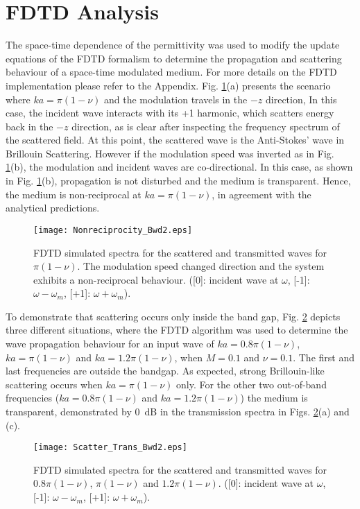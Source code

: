\documentclass[journal]{IEEEtran}
\begin{document}
\section{FDTD Analysis}
The space-time dependence of the permittivity was used to modify the update equations of the FDTD formalism to determine the propagation and scattering behaviour of a space-time modulated medium. For more details on the FDTD implementation please refer to the Appendix. Fig. \ref{fig:Nonrecip_bwd}(a) presents the scenario where $ka=\pi(1-\nu)$ and the modulation travels in the $-z$ direction, In this case, the incident wave interacts with its +1 harmonic, which scatters energy back in the $-z$ direction, as is clear after inspecting the frequency spectrum of the scattered field. At this point, the scattered wave is the Anti-Stokes' wave in Brillouin Scattering. However if the modulation speed was inverted as in Fig. \ref{fig:Nonrecip_bwd}(b), the modulation and incident waves are co-directional. In this case, as shown in Fig. \ref{fig:Nonrecip_bwd}(b), propagation is not disturbed and the medium is transparent. Hence, the medium is non-reciprocal at $ka=\pi(1-\nu)$, in agreement with the analytical predictions.

\begin{figure}
\centering
\texttt{[image: Nonreciprocity\_Bwd2.eps]}
\caption{FDTD simulated spectra for the scattered and transmitted waves for $\pi(1-\nu)$. The modulation speed changed direction and the system exhibits a non-reciprocal behaviour. ([0]: incident wave at $\omega$, [-1]: $\omega-\omega_m$, [+1]: $\omega+\omega_m$).}
\label{fig:Nonrecip_bwd}
\end{figure}

To demonstrate that scattering occurs only inside the band gap, Fig. \ref{fig:Scatter_Trans_Bwd} depicts three different situations, where the FDTD algorithm was used to determine the wave propagation behaviour for an input wave of $ka=0.8\pi(1-\nu)$, $ka=\pi(1-\nu)$ and $ka=1.2\pi(1-\nu)$, when $M=0.1$ and $\nu=0.1$.  The first and last frequencies are outside the bandgap. As expected, strong Brillouin-like scattering occurs when $ka=\pi(1-\nu)$ only. For the other two out-of-band frequencies ($ka=0.8\pi(1-\nu)$ and $ka=1.2\pi(1-\nu)$) the medium is transparent, demonstrated by 0~dB in the transmission spectra in Figs. \ref{fig:Scatter_Trans_Bwd}(a) and (c). 

\begin{figure}
\centering
\texttt{[image: Scatter\_Trans\_Bwd2.eps]}
\caption{FDTD simulated spectra for the scattered and transmitted waves for $0.8\pi(1-\nu)$, $\pi(1-\nu)$ and $1.2\pi(1-\nu)$. ([0]: incident wave at $\omega$, [-1]: $\omega-\omega_m$, [+1]: $\omega+\omega_m$).}
\label{fig:Scatter_Trans_Bwd}
\end{figure}
\end{document}

